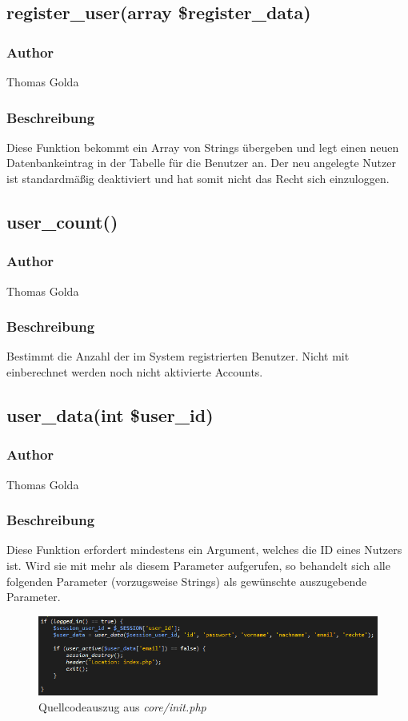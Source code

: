 \documentclass[fontsize = 12pt, paper = a4]{scrreprt}
\begin{document}
\subsection*{register\_user(array \$register\_data)}
\subsubsection*{Author}
Thomas Golda
\subsubsection*{Beschreibung}
Diese Funktion bekommt ein Array von Strings übergeben und legt einen neuen Datenbankeintrag in der Tabelle für die Benutzer an.
Der neu angelegte Nutzer ist standardmäßig deaktiviert und hat somit nicht das Recht sich einzuloggen.


\subsection*{user\_count()}
\subsubsection*{Author}
Thomas Golda
\subsubsection*{Beschreibung}
Bestimmt die Anzahl der im System registrierten Benutzer. Nicht mit einberechnet werden noch nicht aktivierte Accounts.

\newpage

\subsection*{user\_data(int \$user\_id)}
\subsubsection*{Author}
Thomas Golda
\subsubsection*{Beschreibung}
Diese Funktion erfordert mindestens ein Argument, welches die ID eines Nutzers ist. Wird sie mit mehr als diesem Parameter aufgerufen, so 
behandelt sich alle folgenden Parameter (vorzugsweise Strings) als gewünschte auszugebende Parameter.

\begin{figure}[h]
\centering
\includegraphics[scale = 0.78]{userdata.png}
\caption[user\_data() Funktion]{Quellcodeauszug aus \textit{core/init.php}}
\label{Quellcodeauszug aus core/init.php}
\end{figure}
\end{document}
